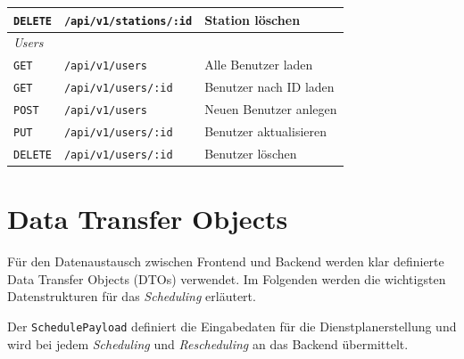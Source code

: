 \begin{table}[H]
\begin{tabularx}{\linewidth}{l >{\raggedright\arraybackslash}X >{\raggedright\arraybackslash}X}
		\texttt{DELETE} & \texttt{/api/v1/stations/:id}                      & Station löschen \\
		\midrule
		\multicolumn{3}{l}{\textit{Users}} \\
		\midrule
		\texttt{GET}    & \texttt{/api/v1/users}                             & Alle Benutzer laden \\
		\texttt{GET}    & \texttt{/api/v1/users/:id}                         & Benutzer nach ID laden \\
		\texttt{POST}   & \texttt{/api/v1/users}                             & Neuen Benutzer anlegen \\
		\texttt{PUT}    & \texttt{/api/v1/users/:id}                         & Benutzer aktualisieren \\
		\texttt{DELETE} & \texttt{/api/v1/users/:id}                         & Benutzer löschen \\
		\bottomrule
	\end{tabularx}
\end{table}

\section{Data Transfer Objects}
Für den Datenaustausch zwischen Frontend und Backend werden klar definierte Data Transfer Objects (DTOs) verwendet.
Im Folgenden werden die wichtigsten Datenstrukturen für das \textit{Scheduling} erläutert.

Der \texttt{SchedulePayload} definiert die Eingabedaten für die Dienstplanerstellung 
und wird bei jedem \textit{Scheduling} und \textit{Rescheduling} an das Backend übermittelt. 

